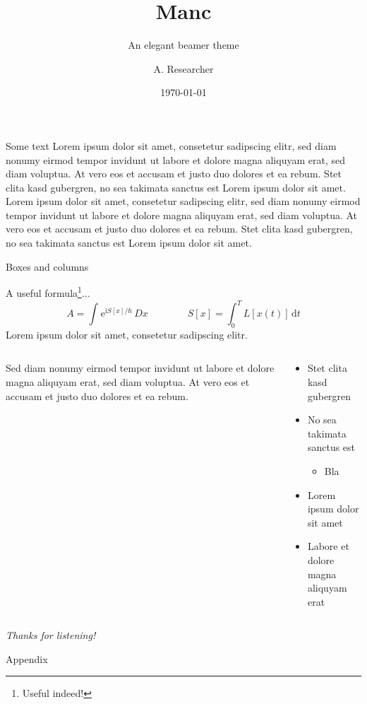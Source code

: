 \documentclass[compress,aspectratio=1610]{beamer}
\title{Manc}
\subtitle{An elegant beamer theme}
\date{\today}
\author[Researcher]{A. Researcher\footnotemark[1]}
\institute{\footnotemark[1]\texttt{mymail@myuniversity.edu}}
\begin{document}
\maketitle

\begin{frame}{Some text}
	Lorem ipsum dolor sit amet, consetetur sadipscing elitr, sed diam nonumy eirmod tempor invidunt ut labore et dolore magna aliquyam erat, sed diam voluptua. At vero eos et accusam et justo duo dolores et ea rebum. Stet clita kasd gubergren, no sea takimata sanctus est Lorem ipsum dolor sit amet. Lorem  ipsum dolor sit amet, consetetur sadipscing elitr, sed diam nonumy eirmod tempor invidunt ut labore et dolore magna aliquyam erat, sed diam voluptua. At vero eos et accusam et justo duo dolores et ea rebum. Stet clita kasd gubergren, no sea takimata sanctus est Lorem ipsum dolor sit amet.
\end{frame}

\begin{frame}{Boxes and columns}
  \begin{block}{A useful formula\footnote[frame]{Useful indeed!}...}
    \begin{equation*}
      A = \int^{}\mathrm{e}^{\mathrm{i} S[x] / \hbar}\,Dx \hspace{4em} S[x] = \int^{T}_0 L[x(t)]\,\mathrm{d}t
    \end{equation*}
    \centering
Lorem ipsum dolor sit amet, consetetur sadipscing elitr.
  \end{block}
  \begin{columns}
    \begin{column}{0.5\textwidth}
      Sed diam nonumy eirmod tempor invidunt ut labore et dolore magna aliquyam erat, sed diam voluptua. At vero eos et accusam et justo duo dolores et ea rebum.
    \end{column}
    \begin{column}{0.5\textwidth}
      \begin{itemize}
        \item Stet clita kasd gubergren
        \item No sea takimata sanctus est
          \begin{itemize}
            \item Bla
          \end{itemize}
        \item Lorem ipsum dolor sit amet
        \item Labore et dolore magna aliquyam erat
      \end{itemize}
    \end{column}
  \end{columns}
\end{frame}

\begin{darkframe}[noframenumbering]
  \centering
  \textit{Thanks for listening!}
\end{darkframe}

\appendix
\begin{darkframe}
  \centering
   Appendix
\end{darkframe}
\end{document}
